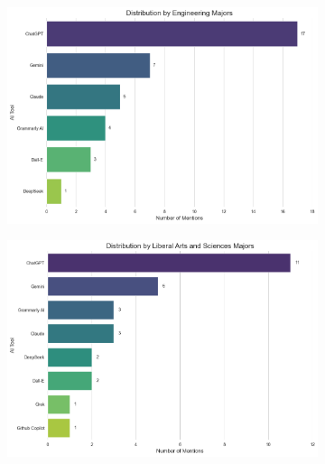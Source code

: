 \documentclass[12pt]{article}
\begin{document}
\begin{figure}[H]
  \centering
  \begin{subfigure}[b]{0.45\textwidth}
    \includegraphics[width=\textwidth]{fig4-1.png} %
    \label{fig:subfig1a}
  \end{subfigure}
  \hfill %
  \begin{subfigure}[b]{0.45\textwidth}
    \includegraphics[width=\textwidth]{fig4-2.png} %
    \label{fig:subfig1b}
  \end{subfigure}
  \hfill %
  \begin{subfigure}[b]{0.45\textwidth}

\end{subfigure}
\end{figure}
\end{document}
